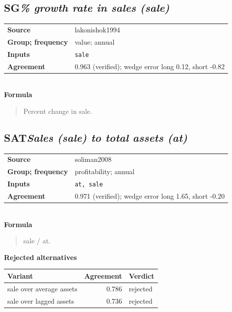 \documentclass[11pt]{article}
\begin{document}
\subsection*{SG\quad\normalfont\itshape \% growth rate in sales (sale)}
\begin{tabular}{@{}p{3.3cm}p{12.3cm}@{}}
\textbf{Source} & lakonishok1994\\
\textbf{Group; frequency} & value; annual\\
\textbf{Inputs} & \texttt{sale}\\
\textbf{Agreement} & 0.963 (verified); wedge error long 0.12, short -0.82\\
\end{tabular}\\[4pt]
\textbf{Formula}
\begin{quote}\small
Percent change in sale.\\

\end{quote}
\subsection*{SAT\quad\normalfont\itshape Sales (sale) to total assets (at)}
\begin{tabular}{@{}p{3.3cm}p{12.3cm}@{}}
\textbf{Source} & soliman2008\\
\textbf{Group; frequency} & profitability; annual\\
\textbf{Inputs} & \texttt{at, sale}\\
\textbf{Agreement} & 0.971 (verified); wedge error long 1.65, short -0.20\\
\end{tabular}\\[4pt]
\textbf{Formula}
\begin{quote}\small
sale / at.\\

\end{quote}
\textbf{Rejected alternatives}\\[2pt]
{\small\begin{longtable}{@{}p{9.6cm}rp{4.3cm}@{}}
\toprule Variant & Agreement & Verdict\\\midrule\endhead
sale over average assets & 0.786 & rejected\\
sale over lagged assets & 0.736 & rejected\\
\bottomrule\end{longtable}}
\end{document}
